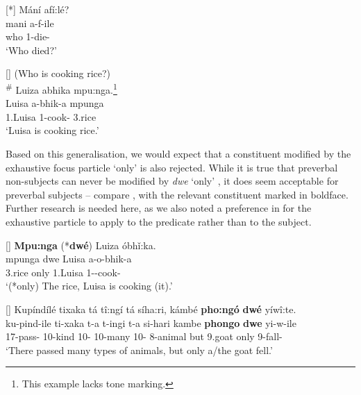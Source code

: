 \documentclass[output=paper]{langscibook}
\begin{document}
\ea
[*]{
\label{bkm:Ref121988341}
Mání afí:lé?\\
\gll
mani  a-f-ile\\
who    1\SM{}-die-\PFV{}\\
\glt
‘Who died?’\\
}

\ex
[]{
\label{bkm:Ref121988348}
(Who is cooking rice?)\\
\textsuperscript{\#} Luiza abhika mpu:nga.\footnote{This example lacks tone marking.}\\
\gll
{\phantom{\textsuperscript{\#}}} Luisa  a-bhik-a  mpunga\\
{} 1.Luisa  1\SM{}-cook-\FV{}  3.rice\\
\glt
\phantom{\textsuperscript{\#}} ‘Luisa is cooking rice.’\\
}

\z

Based on this generalisation, we would expect that a constituent modified by the exhaustive focus particle ‘only’ is also rejected. While it is true that preverbal non-subjects can never be modified by \textit{dwe} ‘only’ , it does seem acceptable for preverbal subjects – compare , with the relevant constituent marked in boldface. Further research is needed here, as we also noted a preference in  for the exhaustive particle to apply to the predicate rather than to the subject.

\ea
[]{
\label{bkm:Ref141347018}
\textbf{Mpu:nga} (*\textbf{dwé}) Luiza óbhǐ:ka.\\
\gll
mpunga dwe  Luisa  a-o-bhik-a\\
3.rice  only  1.Luisa  1\SM{}-\PROG{}-cook-\FV{}\\
\glt
‘(*only) The rice, Luisa is cooking (it).’\\
}

\z

\ea
[]{
Kupíndílé tixaka tá tî:ngí tá síha:ri, kámbé \textbf{pho:ngó} \textbf{dwé} yíwî:te.\\
\gll
ku-pind-ile  ti-xaka  t-a   t-ingi   t-a   si-hari   kambe  \textbf{phongo}  \textbf{dwe}  yi-w-ile\\
17\SM{}-pass-\PFV{}  10-kind  10-\CONN{}  10-many  10-\CONN{}  8-animal but  9.goat  only  9\SM{}-fall-\PFV{}\\
\glt
‘There passed many types of animals, but only a/the goat fell.’
}
 
\end{document}
